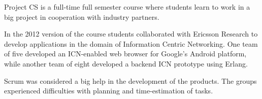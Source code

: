 Project CS is a full-time full semester course where students learn to work in a big project in cooperation with industry partners.

In the 2012 version of the course students collaborated with Ericsson Research to develop applications in the domain of Information Centric Networking.  One team of five developed an ICN-enabled web browser for Google's Android platform, while another team of eight developed a backend ICN prototype using Erlang.

Scrum was considered a big help in the development of the products.
The groups experienced difficulties with planning and time-estimation of tasks.